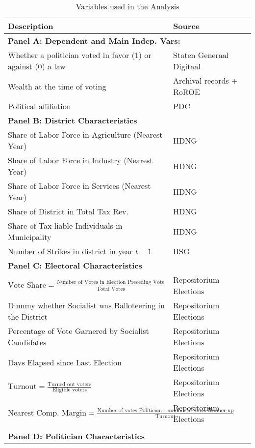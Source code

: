 \begin{table}[!ht]
\caption{Variables used in the Analysis}
    \label{tab:variables_table}
\footnotesize
    \centering
    \begin{tabular}{ll}
    \textbf{Description} & \textbf{Source} \\ \hline
    \multicolumn{2}{l}{\textbf{Panel A: Dependent and Main Indep. Vars:}} \\ \hline
    Whether a politician voted in favor (1) or against (0) a law & Staten Generaal Digitaal\\ 
    Wealth at the time of voting & Archival records + RoROE\\
    Political affiliation & PDC\\
    \multicolumn{2}{l}{\textbf{Panel B: District Characteristics}} \\ \hline
    Share of Labor Force in Agriculture (Nearest Year) & HDNG \\
    Share of Labor Force in Industry (Nearest Year) & HDNG \\
    Share of Labor Force in Services (Nearest Year) & HDNG \\
    Share of District in Total Tax Rev. & HDNG \\
    Share of Tax-liable Individuals in Municipality & HDNG \\
    Number of Strikes in district in year $t-1$ & IISG \\  
    \multicolumn{2}{l}{\textbf{Panel C: Electoral  Characteristics}} \\ \hline
    $\text{Vote Share} = \frac{\text{Number of Votes in Election Preceding Vote}}{\text{Total Votes}}$ & Repositorium Elections\\
    Dummy whether Socialist was Balloteering in the District & Repositorium Elections\\
    Percentage of Vote Garnered by Socialist Candidates & Repositorium Elections\\ 
    Days Elapsed since Last Election & Repositorium Elections\\
    $\text{Turnout} = \frac{\text{Turned out voters}}{\text{Eligible voters}}$ & Repositorium Elections\\
    $\text{Nearest Comp. Margin} = \frac{\text{Number of votes Politician - number of votes Runner-up}}{\text{Turnout}}$ & Repositorium Elections\\
     & \\
    \multicolumn{2}{l}{\textbf{Panel D: Politician Characteristics}} \\ \hline

\end{tabular}
\end{table}
